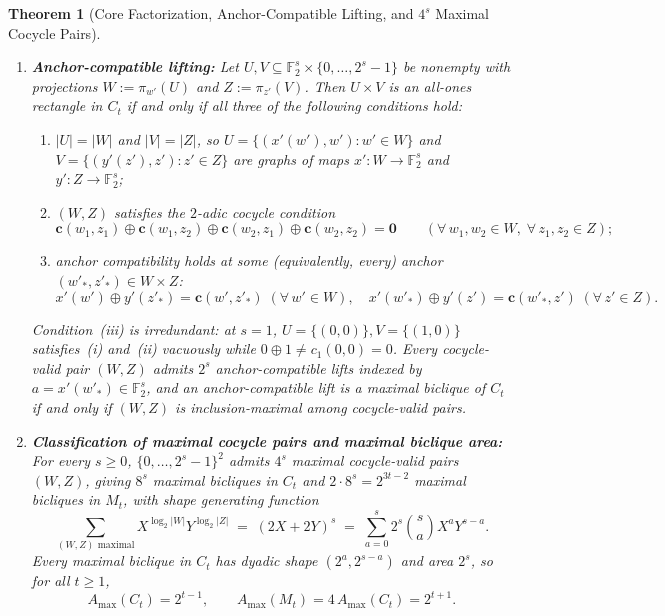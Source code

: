 \documentclass[11pt,reqno]{amsart}
\newtheorem{theorem}{Theorem}[section]
\theoremstyle{definition}
\theoremstyle{remark}
\newcommand{\FF}{\mathbb{F}}
\newcommand{\bv}{\mathbf{c}}
\newcommand{\zero}{\mathbf{0}}
\numberwithin{equation}{section}
\begin{document}
\begin{theorem}[Core Factorization, Anchor-Compatible Lifting, and $4^s$ Maximal Cocycle Pairs]
\begin{enumerate}[leftmargin=2em,label=\textup{(\alph*)}]
    \item \textbf{Anchor-compatible lifting:} Let $U, V \subseteq \FF_2^s \times \{0, \dots, 2^s - 1\}$ be nonempty with projections $W := \pi_{w'}(U)$ and $Z := \pi_{z'}(V)$. Then $U \times V$ is an all-ones rectangle in $C_t$ if and only if all three of the following conditions hold:
    \begin{enumerate}[leftmargin=2em,label=\textup{(\roman*)}]
      \item $|U| = |W|$ and $|V| = |Z|$, so $U = \{(x'(w'), w') : w' \in W\}$ and $V = \{(y'(z'), z') : z' \in Z\}$ are graphs of maps $x' : W \to \FF_2^s$ and $y' : Z \to \FF_2^s$;
      \item $(W, Z)$ satisfies the \emph{$2$-adic cocycle condition}
      \begin{equation}
        \label{eq:cocycle}
        \bv(w_1, z_1) \oplus \bv(w_1, z_2) \oplus \bv(w_2, z_1) \oplus \bv(w_2, z_2) = \zero \qquad (\forall\, w_1, w_2 \in W,\; \forall\, z_1, z_2 \in Z);
      \end{equation}
      \item \emph{anchor compatibility} holds at some (equivalently, every) anchor $(w'_*, z'_*) \in W \times Z$:
      \begin{equation}
        \label{eq:anchor}
        x'(w') \oplus y'(z'_*) = \bv(w', z'_*) \; (\forall\, w' \in W), \quad
        x'(w'_*) \oplus y'(z') = \bv(w'_*, z') \; (\forall\, z' \in Z).
      \end{equation}
    \end{enumerate}
    Condition~\textup{(iii)} is irredundant: at $s = 1$, $U = \{(0, 0)\}, V = \{(1, 0)\}$ satisfies~\textup{(i)} and~\textup{(ii)} vacuously while $0 \oplus 1 \neq c_1(0, 0) = 0$. Every cocycle-valid pair $(W, Z)$ admits $2^s$ anchor-compatible lifts indexed by $a = x'(w'_*) \in \FF_2^s$, and an anchor-compatible lift is a maximal biclique of $C_t$ if and only if $(W, Z)$ is inclusion-maximal among cocycle-valid pairs.

    \item \textbf{Classification of maximal cocycle pairs and maximal biclique area:} For every $s \ge 0$, $\{0, \dots, 2^s - 1\}^2$ admits $4^s$ maximal cocycle-valid pairs $(W, Z)$, giving $8^s$ maximal bicliques in $C_t$ and $2 \cdot 8^s = 2^{3t-2}$ maximal bicliques in $M_t$, with shape generating function
    \begin{equation}
      \label{eq:shape-gf}
      \sum_{(W, Z)\text{ maximal}} X^{\log_2 |W|} Y^{\log_2 |Z|} \;=\; (2X + 2Y)^s \;=\; \sum_{a=0}^{s} 2^s \binom{s}{a} X^a Y^{s-a}.
    \end{equation}
    Every maximal biclique in $C_t$ has dyadic shape $(2^a, 2^{s-a})$ and area $2^s$, so for all $t \ge 1$,
    \begin{equation}
      \label{eq:amax}
      A_{\max}(C_t) = 2^{t-1}, \qquad A_{\max}(M_t) = 4\,A_{\max}(C_t) = 2^{t+1}.
    \end{equation}
  \end{enumerate}
\end{theorem}
\end{document}
